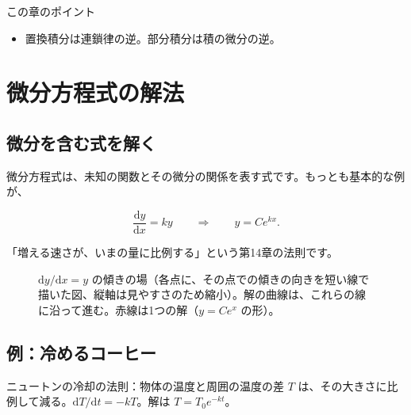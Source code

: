 \documentclass[a4paper,11pt,openany]{ltjsbook}
\newcommand{\dd}{\mathrm{d}}
\begin{document}
\begin{pointbox}{この章のポイント}
\begin{itemize}[leftmargin=1.5em]
\item 置換積分は連鎖律の逆。部分積分は積の微分の逆。
\end{itemize}
\end{pointbox}

\chapter{微分方程式の解法}

\section{微分を含む式を解く}

微分方程式は、未知の関数とその微分の関係を表す式です。もっとも基本的な例が、

\[
\frac{\dd y}{\dd x}=ky\qquad\Longrightarrow\qquad y=Ce^{kx}.
\]

「増える速さが、いまの量に比例する」という第14章の法則です。

\begin{figure}[htbp]
\centering
{}
\caption{$\dd y/\dd x=y$ の傾きの場（各点に、その点での傾きの向きを短い線で描いた図、縦軸は見やすさのため縮小）。解の曲線は、これらの線に沿って進む。赤線は1つの解（$y=Ce^{x}$ の形）。}
\end{figure}

\section{例：冷めるコーヒー}

ニュートンの冷却の法則：物体の温度と周囲の温度の差 $T$ は、その大きさに比例して減る。$\dd T/\dd t=-kT$。解は $T=T_0e^{-kt}$。
\end{document}
